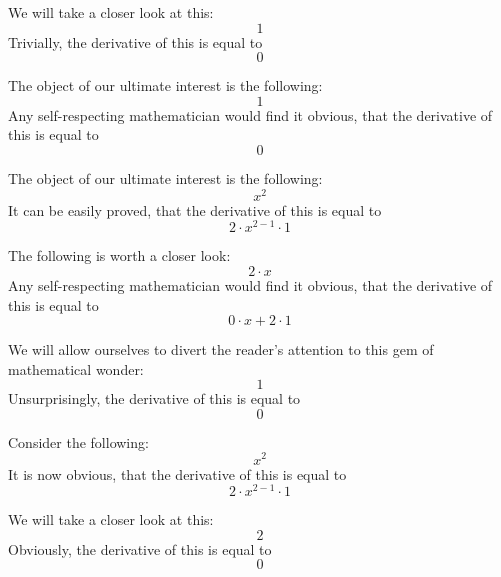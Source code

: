 \documentclass{article}
\begin{document}
We will take a closer look at this:
\begin{equation}
1 
\end{equation}
Trivially, the derivative of this is equal to
\begin{equation}
0 
\end{equation}

The object of our ultimate interest is the following:
\begin{equation}
1 
\end{equation}
Any self-respecting mathematician would find it obvious, that the derivative of this is equal to
\begin{equation}
0 
\end{equation}

The object of our ultimate interest is the following:
\begin{equation}
x ^{2 } 
\end{equation}
It can be easily proved, that the derivative of this is equal to
\begin{equation}
2 \cdot x ^{2 - 1 } \cdot 1 
\end{equation}

The following is worth a closer look:
\begin{equation}
2 \cdot x 
\end{equation}
Any self-respecting mathematician would find it obvious, that the derivative of this is equal to
\begin{equation}
0 \cdot x + 2 \cdot 1 
\end{equation}

We will allow ourselves to divert the reader's attention to this gem of mathematical wonder:
\begin{equation}
1 
\end{equation}
Unsurprisingly, the derivative of this is equal to
\begin{equation}
0 
\end{equation}

Consider the following:
\begin{equation}
x ^{2 } 
\end{equation}
It is now obvious, that the derivative of this is equal to
\begin{equation}
2 \cdot x ^{2 - 1 } \cdot 1 
\end{equation}

We will take a closer look at this:
\begin{equation}
2 
\end{equation}
Obviously, the derivative of this is equal to
\begin{equation}
0 
\end{equation}
\end{document}
